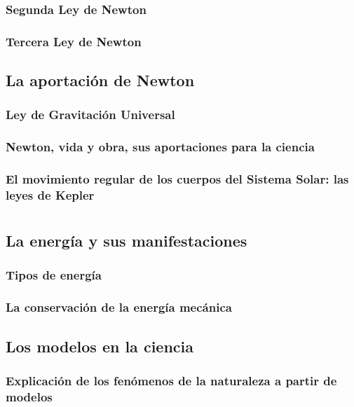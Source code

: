\documentclass[11pt]{book}
\begin{document}
\subsection{Segunda Ley de Newton}
\subsection{Tercera Ley de Newton}

\section{La aportación de Newton}
\subsection{Ley de Gravitación Universal}
\subsection{Newton, vida y obra, sus aportaciones para la ciencia}
\subsection{El movimiento regular de los cuerpos del Sistema Solar: las leyes de Kepler}


\chapter{}

\section{La energía y sus manifestaciones}
\subsection{Tipos de energía}
\subsection{La conservación de la energía mecánica}

\section{Los modelos en la ciencia}
\subsection{Explicación de los fenómenos de la naturaleza a partir de modelos}
\end{document}
